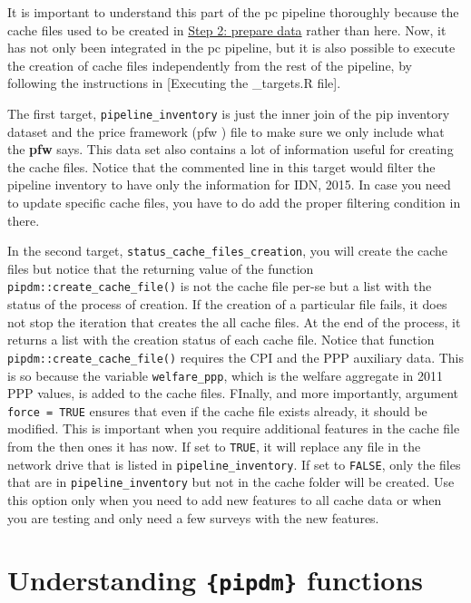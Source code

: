\documentclass[
]{book}
\begin{document}
It is important to understand this part of the pc pipeline thoroughly because
the cache files used to be created in \protect\hyperlink{pipe-prepare-data}{Step 2: prepare data}
rather than here. Now, it has not only been integrated in the pc pipeline, but
it is also possible to execute the creation of cache files independently from
the rest of the pipeline, by following the instructions in {[}Executing the
\_targets.R file{]}.

The first target, \texttt{pipeline\_inventory} is just the inner join of the pip
inventory dataset and the price framework (pfw ) file to make sure we only
include what the \textbf{pfw} says. This data set also contains a lot of information
useful for creating the cache files. Notice that the commented line in this
target would filter the pipeline inventory to have only the information for IDN,
2015. {In case you need to update specific cache files, you have to do add the
proper filtering condition in there}.

In the second target, \texttt{status\_cache\_files\_creation}, you will create the cache
files but notice that the returning value of the function
\texttt{pipdm::create\_cache\_file()} is not the cache file per-se but a list with the
status of the process of creation. If the creation of a particular file fails,
it does not stop the iteration that creates the all cache files. At the end of
the process, it returns a list with the creation status of each cache file.
Notice that function \texttt{pipdm::create\_cache\_file()} requires the CPI and the PPP
auxiliary data. This is so because the variable \texttt{welfare\_ppp}, which is the
welfare aggregate in 2011 PPP values, is added to the cache files. FInally, and
more importantly, argument \texttt{force\ =\ TRUE} ensures that even if the cache file
exists already, it should be modified. This is important when you require
additional features in the cache file from the then ones it has now. If set to
\texttt{TRUE}, it will replace any file in the network drive that is listed in
\texttt{pipeline\_inventory}. If set to \texttt{FALSE}, only the files that are in
\texttt{pipeline\_inventory} but not in the cache folder will be created. Use this
option only when you need to add new features to all cache data or when you are
testing and only need a few surveys with the new features.

\hypertarget{understanding-pipdm-functions}{%
\section{\texorpdfstring{Understanding \texttt{\{pipdm\}} functions}{Understanding \{pipdm\} functions}}\label{understanding-pipdm-functions}}
\end{document}
